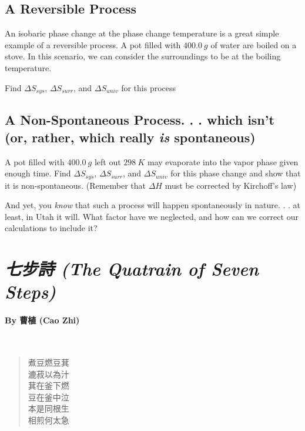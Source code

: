 \documentclass[11pt, letterpaper]{memoir}
\begin{document}
{\begin{center}
\begin{tabular}{cc|c|c|}
	\end{tabular}
\end{center}
\newpage
\subsection*{A Reversible Process}

An isobaric phase change at the phase change temperature is a great simple example of a reversible process. A pot filled with $400.0~g$ of water are boiled on a stove. In this scenario, we can consider the surroundings to be at the boiling temperature.

\noindent Find $\Delta S_{sys}$, $\Delta S_{surr}$, and $\Delta S_{univ}$ for this process

\vspace{6em}
\subsection*{A Non-Spontaneous Process. . . which isn't (or, rather, which really \emph{is} spontaneous)}

A pot filled with $400.0~g$ left out $298~K$ may evaporate into the vapor phase given enough time. Find $\Delta S_{sys}$, $\Delta S_{surr}$, and $\Delta S_{univ}$ for this phase change and show that it is non-spontaneous. (Remember that $\Delta H$ must be corrected by Kirchoff's law)

\vspace{15em}\noindent
And yet, you \emph{know} that such a process will happen spontaneously in nature. . . at least, in Utah it will. What factor have we neglected, and how can we correct our calculations to include it?


\newpage
\pagestyle{empty}
\addtocounter{page}{-1}
\section*{\emph{{七步詩} (The Quatrain of Seven Steps)}}
\paragraph{By {曹植} (Cao Zhi)}~

{
	\begin{verse}
		煮豆燃豆萁\\
		漉菽以為汁\\
		萁在釜下燃\\
		豆在釜中泣\\
		本是同根生\\
		相煎何太急
	\end{verse}
}

}
\end{document}
